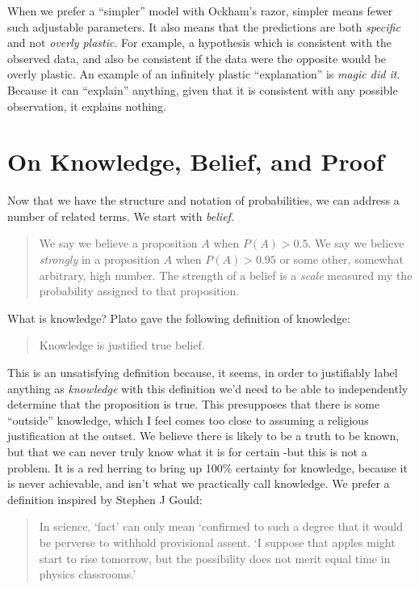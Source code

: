 When we prefer a ``simpler'' model with Ockham's razor, simpler means fewer such adjustable parameters.  It also means that the predictions are both {\em specific} and not {\em overly plastic}. For example, a hypothesis which is consistent with the observed data, and also be consistent if the data were the opposite would be overly plastic.  An example of an infinitely plastic ``explanation'' is {\em magic did it}.  Because it can ``explain'' anything, given that it is consistent with any possible observation, it explains nothing.


\section{On Knowledge, Belief, and Proof}

Now that we have the structure and notation of probabilities, we can address a number of related terms.  We start with {\em belief}. 
\begin{quote}
We say we believe a proposition $A$ when $P(A)>0.5$.  We say we
believe \emph{strongly} in a proposition $A$ when $P(A)>0.95$
or some other, somewhat arbitrary, high number.  The strength of a
belief is a \emph{scale} measured my the probability assigned to that proposition.
\end{quote}

What is knowledge?  Plato gave the following definition of knowledge:

\begin{quote}
Knowledge is justified true belief.\cite{fine2003plato}
\end{quote}

This is an unsatisfying definition because, it seems, in
order to justifiably label anything as \emph{knowledge} with this
definition we'd need to be able to independently determine that the
proposition is true. This presupposes that there is some ``outside''
knowledge, which I feel comes too close to assuming a religious
justification at the outset.  We believe there is likely to be a truth to be known, but that we can never truly know what it is for certain -but this is not a problem. It is a red herring to bring up 100\% certainty for knowledge, because it is never achievable, and isn't what we practically call knowledge. We prefer a definition inspired by Stephen J Gould:

\begin{quote}
In science, `fact' can only mean `confirmed to such a degree that it
would be perverse to withhold provisional assent. `I suppose that apples
might start to rise tomorrow, but the possibility does not merit equal
time in physics classrooms.'\cite{gould1981evolution}
\end{quote}

